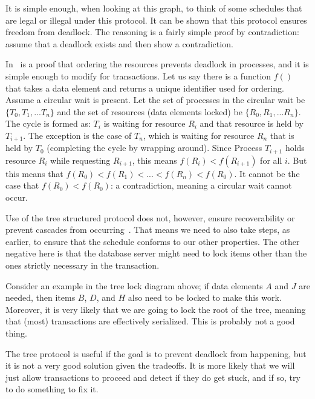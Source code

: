It is simple enough, when looking at this graph, to think of some schedules that are legal or illegal under this protocol. It can be shown that this protocol ensures freedom from deadlock. The reasoning is a fairly simple proof by contradiction: assume that a deadlock exists and then show a contradiction.

In~\cite{osc} is a proof that ordering the resources prevents deadlock in processes, and it is simple enough to modify for transactions. Let us say there is a function $f()$ that takes a data element and returns a unique identifier used for ordering. Assume a circular wait is present. Let the set of processes in the circular wait be $\{T_{0}, T_{1}, ... T_{n}\}$ and the set of resources (data elements locked) be $\{R_{0}, R_{1}, ... R_{n}\}$. The cycle is formed as: $T_{i}$ is waiting for resource $R_{i}$ and that resource is held by $T_{i+1}$. The exception is the case of $T_{n}$, which is waiting for resource $R_{n}$ that is held by $T_{0}$ (completing the cycle by wrapping around). Since Process $T_{i+1}$ holds resource $R_{i}$ while requesting $R_{i+1}$, this means $f(R_{i}) < f(R_{i+1})$ for all $i$. But this means that $f(R_{0}) < f(R_{1}) < ... < f(R_{n}) < f(R_{0})$. It cannot be the case that $f(R_{0}) < f(R_{0})$: a contradiction, meaning a circular wait cannot occur.

Use of the tree structured protocol does not, however, ensure recoverability or prevent cascades from occurring~\cite{dsc}. That means we need to also take steps, as earlier, to ensure that the schedule conforms to our other properties. The other negative here is that the database server might need to lock items other than the ones strictly necessary in the transaction.

Consider an example in the tree lock diagram above; if data elements $A$ and $J$ are needed, then items $B$, $D$, and $H$ also need to be locked to make this work. Moreover, it is very likely that we are going to lock the root of the tree, meaning that (most) transactions are effectively serialized. This is probably not a good thing.

The tree protocol is useful if the goal is to prevent deadlock from happening, but it is not a very good solution given the tradeoffs. It is more likely that we will just allow transactions to proceed and detect if they do get stuck, and if so, try to do something to fix it.




